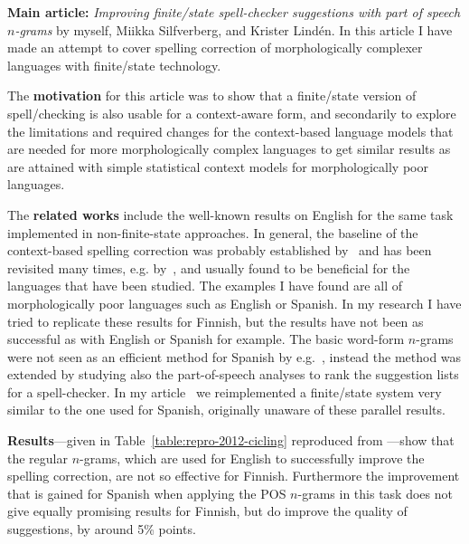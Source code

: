 \documentclass[officiallayout]{unihelcompling}
\begin{document}
\textbf{Main article:} \emph{Improving finite\-/state spell-checker suggestions
with part of speech \(n\)-grams} by myself, Miikka Silfverberg, and Krister
Lindén. In this article I have made an attempt to cover spelling correction
of morphologically complexer languages with finite\-/state technology.

The \textbf{motivation} for this article was to show that a finite\-/state
version of spell\-/checking is also usable for a context-aware form, and
secondarily to explore the limitations and required changes for the
context-based language models that are needed for more morphologically complex
languages to get similar results as are attained with simple statistical
context models for morphologically poor languages.

The \textbf{related works} include the well-known results on English for the
same task implemented in non-finite-state approaches.  In general, the baseline of the
context-based spelling correction was probably established
by~\citet{mays1991context} and has been revisited many times, e.g.
by~\citet{wilcox-ohearn2008realword}, and usually found to be beneficial for
the languages that have been studied. The examples I have found are all of
morphologically poor languages such as English or Spanish. In my research I
have tried to replicate these results for Finnish, but the results have not
been as successful as with English or Spanish for example.  The basic word-form
\(n\)-grams were not seen as an efficient method for Spanish by
e.g.~\citet{otero2007contextual}, instead the method was extended by studying
also the part-of-speech analyses to rank the suggestion lists for a
spell-checker. In my article~ we reimplemented
a finite\-/state system very similar to the one used for Spanish, originally
unaware of these parallel results.

\textbf{Results}---given in Table~\ref{table:repro-2012-cicling} reproduced
from ---show that the regular \(n\)-grams, which
are used for English to successfully improve the spelling correction, are not
so effective for Finnish.  Furthermore the improvement that is gained for
Spanish when applying the POS \(n\)-grams in this task does not give equally
promising results for Finnish, but do improve the quality of suggestions, by
around 5\% points.
\end{document}
